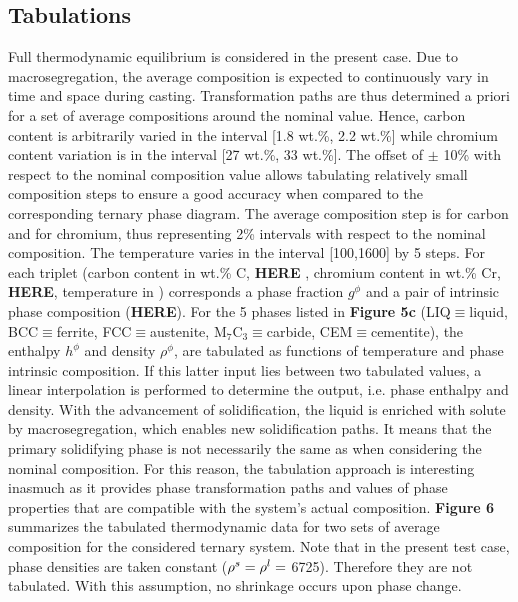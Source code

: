 \subsection{Tabulations}
Full thermodynamic equilibrium is considered in the present case. Due to macrosegregation, 
the average composition is expected to continuously vary in time and space during casting. 
Transformation paths are thus determined a priori for a set of average compositions around 
the nominal value. Hence, carbon content is arbitrarily varied in the interval [1.8 wt.\%, 2.2 wt.\%] 
while chromium content variation is in the interval [27 wt.\%, 33 wt.\%]. The offset of $\pm$ 10\%  with 
respect to the nominal composition value allows tabulating relatively small composition steps to 
ensure a good accuracy when compared to the corresponding ternary phase diagram. The average 
composition step is  for carbon and  for chromium, thus representing 2\% 
intervals with respect to the nominal composition. The temperature varies in the interval 
[\SI{100}{\udegC},\SI{1600}{\udegC}] by \SI{5}{\udegC} steps. For each triplet (carbon content 
in wt.\% C, \textbf{HERE} , chromium content in wt.\% Cr, \textbf{HERE}, temperature in \si{\udegK}) 
corresponds a phase fraction $g^\phi$ and a pair of intrinsic phase composition (\textbf{HERE}). For the 5 
phases listed in \textbf{Figure 5c} (LIQ$\equiv$liquid, BCC$\equiv$ferrite, FCC$\equiv$austenite, 
$\text{M}_7 \text{C}_3 \equiv$carbide, CEM$\equiv$cementite), the enthalpy $h^\phi$ and density $\rho^\phi$, are tabulated 
as functions of temperature and phase intrinsic composition. If this latter input lies between two tabulated 
values, a linear interpolation is performed to determine the output, i.e. phase enthalpy and density. With 
the advancement of solidification, the liquid is enriched with solute by macrosegregation, which enables new 
solidification paths. It means that the primary solidifying phase is not necessarily the same as when considering 
the nominal composition. For this reason, the tabulation approach is interesting inasmuch as it provides phase 
transformation paths and values of phase properties that are compatible with the system’s actual composition. 
\textbf{Figure 6} summarizes the tabulated thermodynamic data for two sets of average composition for the considered 
ternary system. Note that in the present test case, phase densities are taken constant ($\rho^s=\rho^l=$ \SI{6725}{\udensity}). 
Therefore they are not tabulated. With this assumption, no shrinkage occurs upon phase change.
%
